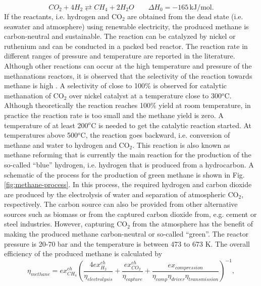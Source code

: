 \documentclass{ECOS_2021}
\begin{document}
\begin{equation}
CO_{2}+4H_{2}\rightleftarrows CH_{4}+2H_{2}O\qquad\Delta H_{0}=-165\,\textrm{kJ/mol}.\label{eq:methane}
\end{equation}
If the reactants, i.e. hydrogen and CO$_{2}$ are obtained from the
dead state (i.e. seawater and atmosphere) using renewable electricity,
the produced methane is carbon-neutral and sustainable. The reaction
can be catalyzed by nickel or ruthenium and can be conducted in a
packed bed reactor. The reaction rate in different ranges of pressure
and temperature are reported in the literature. Although other reactions
can occur at the high temperature and pressure of the methanations
reactors, it is observed that the selectivity of the reaction towards
methane is high \cite{loderReactionKineticsCO22020}. A selectivity
of close to 100\% is observed for catalytic methanation of CO$_{2}$
over nickel catalyst at a temperature close to 300$^{o}$C. Although
theoretically the reaction reaches 100\% yield at room temperature,
in practice the reaction rate is too small and the methane yield is
zero. A temperature of at least 200$^{o}$C is needed to get the catalytic
reaction started. At temperatures above 500$^{o}$C, the reaction
goes backward, i.e. conversion of methane and water to hydrogen and
CO$_{2}$. This reaction is also known as methane reforming that is
currently the main reaction for the production of the so-called ``blue''
hydrogen, i.e. hydrogen that is produced from a hydrocarbon. A schematic
of the process for the production of green methane is shown in Fig.
\ref{fig:methane-process}. In this process, the required hydrogen
and carbon dioxide are produced by the electrolysis of water and separation
of atmospheric CO$_{2}$, respectively. The carbon source can also
be provided from other alternative sources such as biomass or from
the captured carbon dioxide from, e.g. cement or steel industries.
However, capturing CO$_{2}$ from the atmosphere has the benefit of
making the produced methane carbon-neutral or so-called ``green''.
The reactor pressure is 20-70 bar \cite{er-rbibModellingSimulationMethanation2013}
and the temperature is between 473 to 673 K. The overall efficiency
of the produced methane is calculated by
\begin{equation}
\eta_{methane}=ex_{CH_{4}}^{ch}\left(\frac{4ex_{H_{2}}^{ch}}{\eta_{electrolysis}}+\frac{ex_{CO_{2}}^{ch}}{\eta_{capture}}+\frac{ex_{compression}}{\eta_{comp}\eta_{driver}\eta_{transmission}}\right)^{-1},\label{eq:methane-efficiency}
\end{equation}
\end{document}
